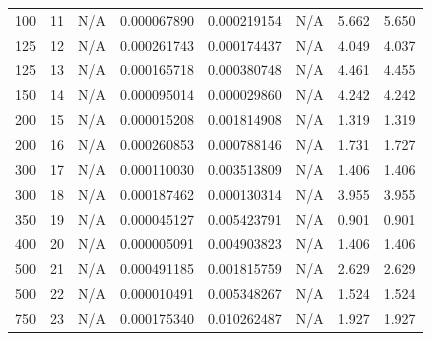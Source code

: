 \documentclass[letterpaper,10pt]{article}
\begin{document}
\begin{table}[H]
{\begin{tabular}{|c|c|c|c|c|c|c|c|}
      100  & 11  & N/A         & \cellcolor{sgreen}0.000067890 & \cellcolor{syellow}0.000219154 & N/A    & \cellcolor{sred}5.662  & \cellcolor{sgreen}5.650  \\ 
      125  & 12  & N/A         & \cellcolor{syellow}0.000261743 & \cellcolor{sgreen}0.000174437 & N/A    & \cellcolor{sred}4.049  & \cellcolor{sgreen}4.037  \\ 
      125  & 13  & N/A         & \cellcolor{sgreen}0.000165718 & \cellcolor{syellow}0.000380748 & N/A    & \cellcolor{sred}4.461  & \cellcolor{sgreen}4.455  \\ 
      150  & 14  & N/A         & \cellcolor{syellow}0.000095014 & \cellcolor{sgreen}0.000029860 & N/A    & \cellcolor{sgreen}4.242  & \cellcolor{sgreen}4.242  \\ 
      200  & 15  & N/A         & \cellcolor{sgreen}0.000015208 & \cellcolor{syellow}0.001814908 & N/A    & \cellcolor{sgreen}1.319  & \cellcolor{sgreen}1.319  \\ 
      200  & 16  & N/A         & \cellcolor{sgreen}0.000260853 & \cellcolor{syellow}0.000788146 & N/A    & \cellcolor{sred}1.731  & \cellcolor{sgreen}1.727  \\ 
      300  & 17  & N/A         & \cellcolor{sgreen}0.000110030 & \cellcolor{syellow}0.003513809 & N/A    & \cellcolor{sgreen}1.406  & \cellcolor{sgreen}1.406  \\ 
      300  & 18  & N/A         & \cellcolor{syellow}0.000187462 & \cellcolor{sgreen}0.000130314 & N/A    & \cellcolor{sgreen}3.955  & \cellcolor{sgreen}3.955  \\ 
      350  & 19  & N/A         & \cellcolor{sgreen}0.000045127 & \cellcolor{syellow}0.005423791 & N/A    & \cellcolor{sgreen}0.901  & \cellcolor{sgreen}0.901  \\ 
      400  & 20  & N/A         & \cellcolor{sgreen}0.000005091 & \cellcolor{syellow}0.004903823 & N/A    & \cellcolor{sgreen}1.406  & \cellcolor{sgreen}1.406  \\ 
      500  & 21  & N/A         & \cellcolor{sgreen}0.000491185 & \cellcolor{syellow}0.001815759 & N/A    & \cellcolor{sgreen}2.629  & \cellcolor{sgreen}2.629  \\ 
      500  & 22  & N/A         & \cellcolor{sgreen}0.000010491 & \cellcolor{syellow}0.005348267 & N/A    & \cellcolor{sgreen}1.524  & \cellcolor{sgreen}1.524  \\ 
      750  & 23  & N/A         & \cellcolor{sgreen}0.000175340 & \cellcolor{syellow}0.010262487 & N/A    & \cellcolor{sgreen}1.927  & \cellcolor{sgreen}1.927  \\ 

\end{tabular}}
\end{table}
\end{document}
